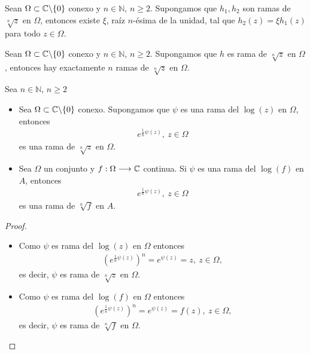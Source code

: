 \begin{prop}
    Sean $\Omega \subset \mathbb{C} \backslash \{0\}$ conexo y $n \in \mathbb{N}$, $n \ge 2$. Supongamos que $h_1,h_2$ son ramas de $\sqrt[n]{z}$ en $\Omega$, entonces existe $\xi$, raíz $n$-ésima de la unidad, tal que $h_2(z) = \xi h_1(z)$ para todo $z \in \Omega$.
\end{prop}

\begin{prop}
    Sean $\Omega \subset \mathbb{C} \backslash \{0\}$ conexo y $n \in \mathbb{N}$, $n \ge 2$. Supongamos que $h$ es rama de $\sqrt[n]{z}$ en $\Omega$, entonces hay exactamente $n$ ramas de $\sqrt[n]{z}$ en $\Omega$.
\end{prop}

\begin{prop}
    Sea $n \in \mathbb{N}$, $n \ge 2$
    \begin{itemize}
        \item Sea $\Omega \subset \mathbb{C} \backslash \{0\}$ conexo. Supongamos que $\psi$ es una rama del $\log(z)$ en $\Omega$, entonces
              \begin{align*}
                  e^{\frac{1}{n}\psi(z)}, \ z \in \Omega
              \end{align*}
              es una rama de $\sqrt[n]{z}$ en $\Omega$.
        \item Sea $\Omega$ un conjunto y $f : \Omega \longrightarrow \mathbb{C}$ continua. Si $\psi$ es una rama del $\log(f)$ en $A$, entonces
              \begin{align*}
                  e^{\frac{1}{n}\psi(z)}, \ z \in \Omega
              \end{align*}
              es una rama de $\sqrt[n]{f}$ en $A$.
    \end{itemize}
\end{prop}

\begin{proof}
    \begin{itemize}
        \item Como $\psi$ es rama del $\log(z)$ en $\Omega$ entonces
              \begin{align*}
                  \left(e^{\frac{1}{n}\psi(z)} \right)^n = e^{\psi(z)} = z, \ z \in \Omega,
              \end{align*}
              es decir, $\psi$ es rama de $\sqrt[n]{z}$ en $\Omega$.
        \item Como $\psi$ es rama del $\log(f)$ en $\Omega$ entonces
              \begin{align*}
                  \left(e^{\frac{1}{n}\psi(z)} \right)^n = e^{\psi(z)} = f(z), \ z \in \Omega,
              \end{align*}
              es decir, $\psi$ es rama de $\sqrt[n]{f}$ en $\Omega$.
    \end{itemize}
\end{proof}

